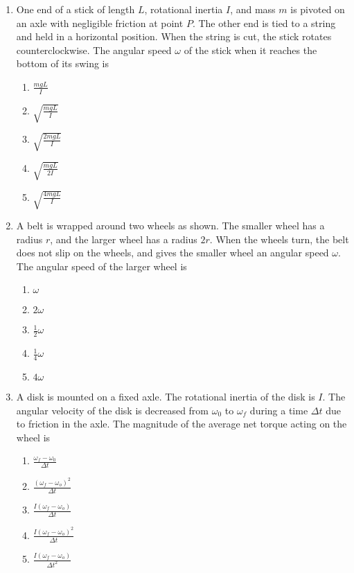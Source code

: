 \documentclass{../../oss-apphys}
\begin{document}
\begin{multicols}{2}
\begin{enumerate}[leftmargin=18pt]
  \item One end of a stick of length $L$, rotational inertia $I$, and mass $m$ is
    pivoted on an axle with negligible friction at point $P$. The other end is
    tied to a string and held in a horizontal position. When the string is cut,
    the stick rotates counterclockwise. The angular speed $\omega$ of the stick
    when it reaches the bottom of its swing is
    \begin{center}
    \end{center}
    \begin{enumerate}[noitemsep,topsep=0pt]
    \item$\displaystyle\frac{mgL}{I}$
    \item$\displaystyle\sqrt{\frac{mgL}{I}}$
    \item$\displaystyle\sqrt{\frac{2mgL}{I}}$
    \item$\displaystyle\sqrt{\frac{mgL}{2I}}$
    \item$\displaystyle\sqrt{\frac{4mgL}{I}}$
    \end{enumerate}

  \item A belt is wrapped around two wheels as shown. The smaller wheel has
    a radius $r$, and the larger wheel has a radius $2r$. When the wheels turn,
    the belt does not slip on the wheels, and gives the smaller wheel an
    angular speed $\omega$. The angular speed of the larger wheel is
    \begin{center}
    \end{center}
  
    \begin{enumerate}[noitemsep,topsep=0pt]
    \item $\displaystyle \omega$
    \item $\displaystyle 2\omega$
    \item $\displaystyle \frac{1}{2}\omega$
    \item $\displaystyle \frac{1}{4}\omega$
    \item $\displaystyle 4\omega$
    \end{enumerate}
    \columnbreak

  \item A disk is mounted on a fixed axle. The rotational inertia of the disk is
    $I$. The angular velocity of the disk is decreased from $\omega_0$ to
    $\omega_f$ during a time $\Delta t$ due to friction in the axle. The
    magnitude of the average net torque acting on the wheel is
    \begin{enumerate}[noitemsep,topsep=0pt]
    \item $\displaystyle\frac{\omega_f-\omega_0}{\Delta t}$
    \item $\displaystyle\frac{(\omega_f-\omega_o)^2}{\Delta t}$
    \item $\displaystyle\frac{I(\omega_f-\omega_o)}{\Delta t}$
    \item $\displaystyle\frac{I(\omega_f-\omega_o)^2}{\Delta t}$
    \item $\displaystyle\frac{I(\omega_f-\omega_o)}{\Delta t^2}$
    \end{enumerate}


\end{enumerate}
\end{multicols}
\end{document}
